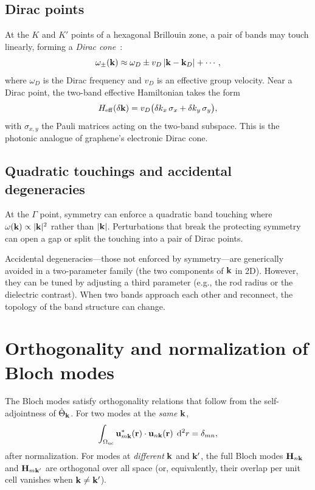 \subsection{Dirac points}
\label{ssec:dirac}

At the $K$ and $K'$ points of a hexagonal Brillouin zone, a pair of bands
may touch linearly, forming a \emph{Dirac cone}~\cite{haldane2008possible,rechtsman2013photonic,khanikaev2013photonic}:
\begin{equation}
 \omega_\pm(\mathbf{k}) \approx \omega_D \pm v_D\,|\mathbf{k} - \mathbf{k}_D| + \cdots,
 \label{eq:dirac-cone}
\end{equation}
where $\omega_D$ is the Dirac frequency and $v_D$ is an effective group
velocity. Near a Dirac point, the two-band effective Hamiltonian takes
the form
\begin{equation}
 H_{\mathrm{eff}}(\delta\mathbf{k})
 = v_D\bigl(\delta k_x\,\sigma_x + \delta k_y\,\sigma_y\bigr),
 \label{eq:dirac-hamiltonian}
\end{equation}
with $\sigma_{x,y}$ the Pauli matrices acting on the two-band subspace.
This is the photonic analogue of graphene's electronic Dirac cone.

\subsection{Quadratic touchings and accidental degeneracies}
\label{ssec:quadratic}

At the $\Gamma$ point, symmetry can enforce a quadratic band touching
where $\omega(\mathbf{k}) \propto |\mathbf{k}|^2$ rather than $|\mathbf{k}|$. Perturbations
that break the protecting symmetry can open a gap or split the touching
into a pair of Dirac points.

Accidental degeneracies---those not enforced by symmetry---are generically
avoided in a two-parameter family (the two components of $\mathbf{k}$ in 2D).
However, they can be tuned by adjusting a third parameter (e.g., the
rod radius or the dielectric contrast). When two bands approach each
other and reconnect, the topology of the band structure can change.


\section{Orthogonality and normalization of Bloch modes}
\label{sec:bloch-orthogonality}

The Bloch modes satisfy orthogonality relations that follow from the
self-adjointness of $\hat{\Theta}_{\mathbf{k}}$. For two modes at the \emph{same}
$\mathbf{k}$,
\begin{equation}
 \int_{\Omega_{\mathrm{uc}}}
 \mathbf{u}_{m\mathbf{k}}^*(\mathbf{r})\cdot\mathbf{u}_{n\mathbf{k}}(\mathbf{r})\;\mathop{}\!\mathrm{d}^2 r
 = \delta_{mn},
 \label{eq:bloch-ortho}
\end{equation}
after normalization. For modes at \emph{different} $\mathbf{k}$ and $\mathbf{k}'$, the
full Bloch modes $\mathbf{H}_{n\mathbf{k}}$ and $\mathbf{H}_{m\mathbf{k}'}$ are orthogonal over all
space (or, equivalently, their overlap per unit cell vanishes when
$\mathbf{k} \neq \mathbf{k}'$).

